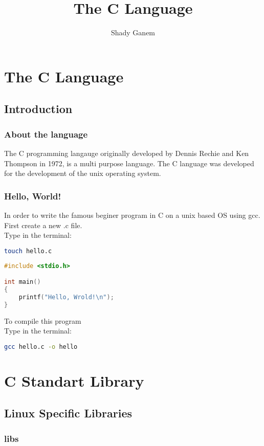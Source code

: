 \documentclass{book}
\title{The C Language}
\author{Shady Ganem}
\begin{document}
\maketitle
\tableofcontents
{}

\part{The C Language}
\chapter{Introduction}
\section{About the language}
The C programming langauge originally developed by Dennis Rechie and Ken Thompson in 1972, 
is a multi purpose language. The C language was developed for the development of the unix operating system.
\section{Hello, World!}
In order to write the famous beginer program in C on a unix based OS using gcc.\\
First create a new .c file. \\
Type in the terminal:
\begin{lstlisting}[language=bash]
touch hello.c
\end{lstlisting}
\begin{lstlisting}[language=C]
#include <stdio.h>

int main()
{
    printf("Hello, Wrold!\n");
}
\end{lstlisting}
To compile this program\\
Type in the terminal:
\begin{lstlisting}[language=bash]
gcc hello.c -o hello
\end{lstlisting}


\part{C Standart Library}

\chapter{Linux Specific Libraries}
\section{libs}
\end{document}
